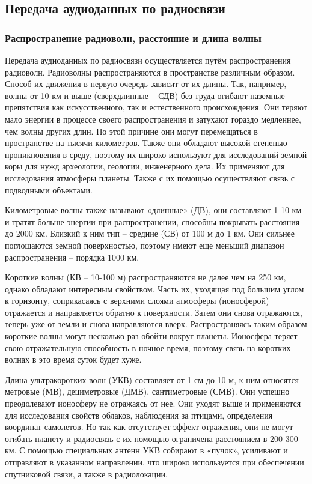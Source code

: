 \documentclass[a4paper]{report}
\begin{document}
\subsection{Передача аудиоданных по радиосвязи}

\subsubsection{Распространение радиоволн, расстояние и длина волны}

Передача аудиоданных по радиосвязи осуществляется путём распространения радиоволн. Радиоволны распространяются в пространстве различным образом. Способ их движения в первую очередь зависит от их длины. Так, например, волны от 10 км и выше (сверхдлинные – СДВ) без труда огибают наземные препятствия как искусственного, так и естественного происхождения. Они теряют мало энергии в процессе своего распространения и затухают гораздо медленнее, чем волны других длин. По этой причине они могут перемещаться в пространстве на тысячи километров. Также они обладают высокой степенью проникновения в среду, поэтому их широко используют для исследований земной коры для нужд археологии, геологии, инженерного дела. Их применяют для исследования атмосферы планеты. Также с их помощью осуществляют связь с подводными объектами.

Километровые волны также называют «длинные» (ДВ), они составляют 1-10 км и тратят больше энергии при распространении, способны покрывать расстояния до 2000 км. Близкий к ним тип – средние (СВ) от 100 м до 1 км. Они сильнее поглощаются земной поверхностью, поэтому имеют еще меньший диапазон распространения – порядка 1000 км.

Короткие волны (КВ – 10-100 м) распространяются не далее чем на 250 км, однако обладают интересным свойством. Часть их, уходящая под большим углом к горизонту, соприкасаясь с верхними слоями атмосферы (ионосферой) отражается и направляется обратно к поверхности. Затем они снова отражаются, теперь уже от земли и снова направляются вверх. Распространяясь таким образом короткие волны могут несколько раз обойти вокруг планеты. Ионосфера теряет свою отражательную способность в ночное время, поэтому связь на коротких волнах в это время суток будет хуже.

Длина ультракоротких волн (УКВ) составляет от 1 см до 10 м, к ним относятся метровые (МВ), дециметровые (ДМВ), сантиметровые (СМВ). Они успешно преодолевают ионосферу не отражаясь от нее. Они уходят выше и применяются для исследования свойств облаков, наблюдения за птицами, определения координат самолетов. Но так как отсутствует эффект отражения, они не могут огибать планету и радиосвязь с их помощью ограничена расстоянием в 200-300 км. С помощью специальных антенн УКВ собирают в «пучок», усиливают и отправляют в указанном направлении, что широко используется при обеспечении спутниковой связи, а также в радиолокации.
\end{document}
